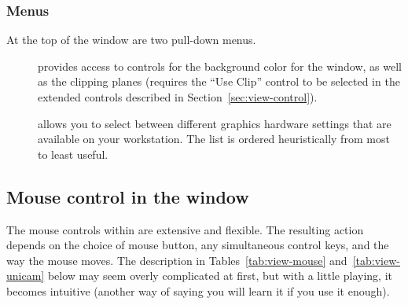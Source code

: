 \subsubsection{Menus}

At the top of the \viewer{} window are two pull-down menus.
\begin{description}
  \item [ ] provides access to controls for the background
        color for the window, as well as the clipping planes (requires the
        ``Use Clip'' control to be selected in the extended controls
        described in Section~\ref{sec:view-control}).
  \item [ ] allows you to select between different graphics
        hardware settings that are available on your workstation.  The list
        is ordered heuristically from most to least useful.
\end{description}

\subsection{Mouse control in the \viewer{} window}
\label{sec:view-mouse} 

The mouse controls within \SR{} are extensive and flexible.  The resulting
action depends on the choice of mouse button, any simultaneous control
keys, and the way the mouse moves.  The description in
Tables~\ref{tab:view-mouse} and~\ref{tab:view-unicam} below may seem overly
complicated at first, but with a little playing, it becomes intuitive
(another way of saying you will learn it if you use it enough).

